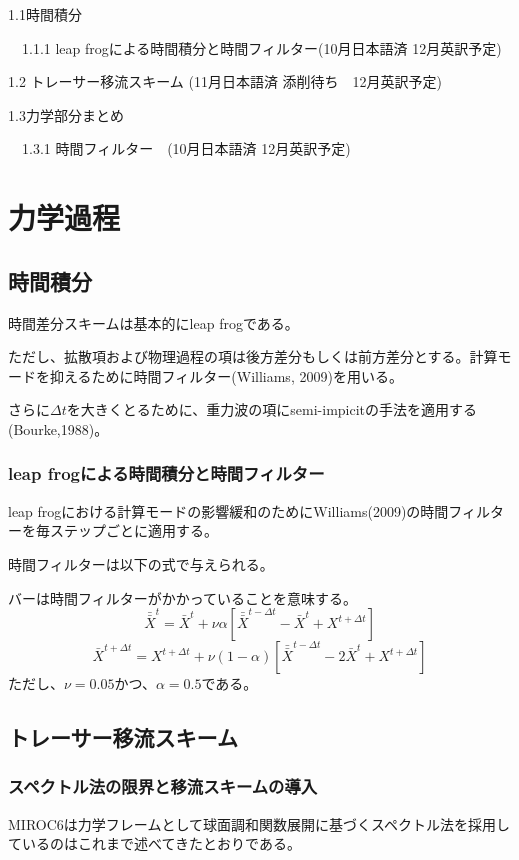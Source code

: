 \documentclass{jsbook}
\begin{document}
1.1時間積分

　1.1.1 leap frogによる時間積分と時間フィルター(10月日本語済 12月英訳予定)

1.2 トレーサー移流スキーム (11月日本語済 添削待ち　12月英訳予定)

1.3力学部分まとめ

　1.3.1 時間フィルター　(10月日本語済 12月英訳予定)
\chapter{力学過程}
\section{時間積分}
時間差分スキームは基本的にleap frogである。

ただし、拡散項および物理過程の項は後方差分もしくは前方差分とする。計算モードを抑えるために時間フィルター(Williams, 2009)を用いる。

さらに$\Delta t$を大きくとるために、重力波の項にsemi-impicitの手法を適用する(Bourke,1988)。
\subsection{leap frogによる時間積分と時間フィルター}
leap frogにおける計算モードの影響緩和のためにWilliams(2009)の時間フィルターを毎ステップごとに適用する。

時間フィルターは以下の式で与えられる。

バーは時間フィルターがかかっていることを意味する。
\begin{equation}   
\bar{\bar{X}}^{t} = \bar{X}^{t} + \nu \alpha [\bar{\bar{X}}^{t-\Delta t} - \bar{X}^{t} + X^{t+\Delta t}] 
\end{equation}
\begin{equation}   
\bar{X}^{t+\Delta t} = X^{t+\Delta t} + \nu (1-\alpha) [\bar{\bar{X}}^{t-\Delta t} - 2 \bar{X}^{t} + X^{t+\Delta t}] 
\end{equation}
ただし、$\nu=0.05$かつ、$\alpha=0.5$である。
\section{トレーサー移流スキーム}
\subsection{スペクトル法の限界と移流スキームの導入}
MIROC6は力学フレームとして球面調和関数展開に基づくスペクトル法を採用しているのはこれまで述べてきたとおりである。
\end{document}
